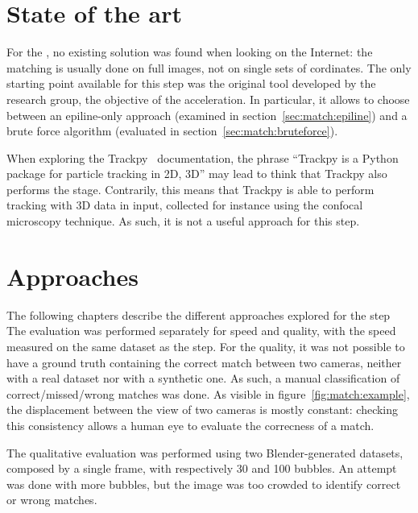 \section{State of the art}

For the \match*, no existing solution was found when looking on the Internet: the matching is usually done on full images, not on single sets of cordinates.
The only starting point available for this step was the original tool developed by the research group, the objective of the acceleration.
In particular, it allows to choose between an epiline-only approach (examined in section~\ref{sec:match:epiline}) and a brute force algorithm (evaluated in section~\ref{sec:match:bruteforce}).

When exploring the Trackpy~\cite{trackpy} documentation, the phrase ``Trackpy is a Python package for particle tracking in 2D, 3D'' may lead to think that Trackpy also performs the \match* stage.
Contrarily, this means that Trackpy is able to perform tracking with 3D data in input, collected for instance using the confocal microscopy technique.
As such, it is not a useful approach for this step.

\section{Approaches}

The following chapters describe the different approaches explored for the \match* step
The evaluation was performed separately for speed and quality, with the speed measured on the same dataset as the \linkDD* step.
For the quality, it was not possible to have a ground truth containing the correct match between two cameras, neither with a real dataset nor with a synthetic one.
As such, a manual classification of correct/missed/wrong matches was done.
As visible in figure~\ref{fig:match:example}, the displacement between the view of two cameras is mostly constant: checking this consistency allows a human eye to evaluate the correcness of a match.

The qualitative evaluation was performed using two Blender-generated datasets, composed by a single frame, with respectively 30 and 100 bubbles.
An attempt was done with more bubbles, but the image was too crowded to identify correct or wrong matches.

